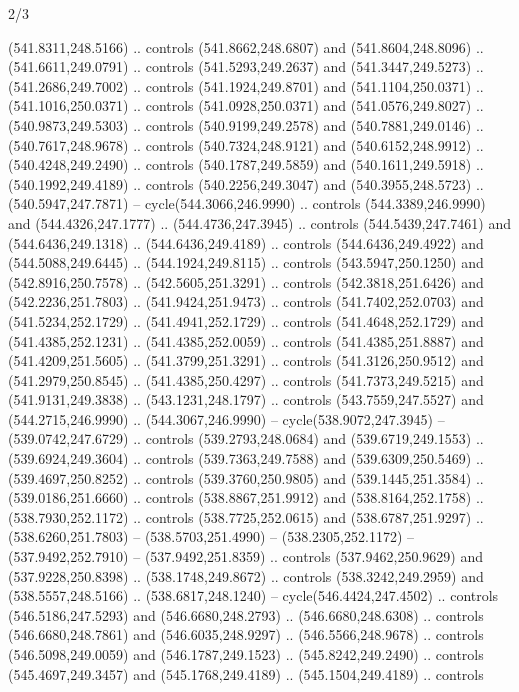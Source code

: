 \begin{flagdescription}{2/3}
\begin{scope}[xshift=0.5\flaglength,yshift=0.5\flagwidth,scale=\flagwidth/495.65]
\begin{scope}[y=0.8pt, x=0.8pt, yscale=-1,shift={(-463.76,-309.78)}]
  (541.8311,248.5166) .. controls (541.8662,248.6807) and (541.8604,248.8096) ..
  (541.6611,249.0791) .. controls (541.5293,249.2637) and (541.3447,249.5273) ..
  (541.2686,249.7002) .. controls (541.1924,249.8701) and (541.1104,250.0371) ..
  (541.1016,250.0371) .. controls (541.0928,250.0371) and (541.0576,249.8027) ..
  (540.9873,249.5303) .. controls (540.9199,249.2578) and (540.7881,249.0146) ..
  (540.7617,248.9678) .. controls (540.7324,248.9121) and (540.6152,248.9912) ..
  (540.4248,249.2490) .. controls (540.1787,249.5859) and (540.1611,249.5918) ..
  (540.1992,249.4189) .. controls (540.2256,249.3047) and (540.3955,248.5723) ..
  (540.5947,247.7871) -- cycle(544.3066,246.9990) .. controls
  (544.3389,246.9990) and (544.4326,247.1777) .. (544.4736,247.3945) .. controls
  (544.5439,247.7461) and (544.6436,249.1318) .. (544.6436,249.4189) .. controls
  (544.6436,249.4922) and (544.5088,249.6445) .. (544.1924,249.8115) .. controls
  (543.5947,250.1250) and (542.8916,250.7578) .. (542.5605,251.3291) .. controls
  (542.3818,251.6426) and (542.2236,251.7803) .. (541.9424,251.9473) .. controls
  (541.7402,252.0703) and (541.5234,252.1729) .. (541.4941,252.1729) .. controls
  (541.4648,252.1729) and (541.4385,252.1231) .. (541.4385,252.0059) .. controls
  (541.4385,251.8887) and (541.4209,251.5605) .. (541.3799,251.3291) .. controls
  (541.3126,250.9512) and (541.2979,250.8545) .. (541.4385,250.4297) .. controls
  (541.7373,249.5215) and (541.9131,249.3838) .. (543.1231,248.1797) .. controls
  (543.7559,247.5527) and (544.2715,246.9990) .. (544.3067,246.9990) --
  cycle(538.9072,247.3945) -- (539.0742,247.6729) .. controls
  (539.2793,248.0684) and (539.6719,249.1553) .. (539.6924,249.3604) .. controls
  (539.7363,249.7588) and (539.6309,250.5469) .. (539.4697,250.8252) .. controls
  (539.3760,250.9805) and (539.1445,251.3584) .. (539.0186,251.6660) .. controls
  (538.8867,251.9912) and (538.8164,252.1758) .. (538.7930,252.1172) .. controls
  (538.7725,252.0615) and (538.6787,251.9297) .. (538.6260,251.7803) --
  (538.5703,251.4990) -- (538.2305,252.1172) -- (537.9492,252.7910) --
  (537.9492,251.8359) .. controls (537.9462,250.9629) and (537.9228,250.8398) ..
  (538.1748,249.8672) .. controls (538.3242,249.2959) and (538.5557,248.5166) ..
  (538.6817,248.1240) -- cycle(546.4424,247.4502) .. controls
  (546.5186,247.5293) and (546.6680,248.2793) .. (546.6680,248.6308) .. controls
  (546.6680,248.7861) and (546.6035,248.9297) .. (546.5566,248.9678) .. controls
  (546.5098,249.0059) and (546.1787,249.1523) .. (545.8242,249.2490) .. controls
  (545.4697,249.3457) and (545.1768,249.4189) .. (545.1504,249.4189) .. controls

\end{scope}
\end{scope}
\end{flagdescription}
